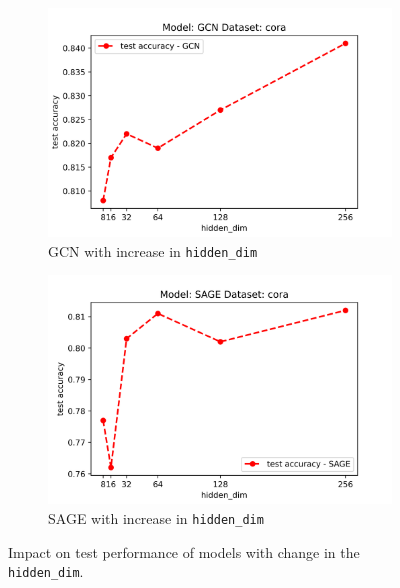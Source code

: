 \documentclass[11pt]{article}
\begin{document}
    \begin{figure}[H]
        \centering
        \begin{subfigure}{0.5\linewidth}
            \includegraphics[width=1\linewidth]{GCN_hiddendim.png}
            \caption{GCN with increase in \texttt{hidden\_dim}}
        \end{subfigure}%
        \begin{subfigure}{0.5\linewidth}
            \includegraphics[width=1\linewidth]{SAGE_hiddendim.png}
            \caption{SAGE with increase in \texttt{hidden\_dim}}
        \end{subfigure}
        \caption{Impact on test performance of models with change in the \texttt{hidden\_dim}.}
    \end{figure}
    
\end{document}
